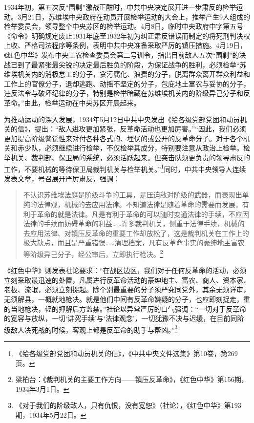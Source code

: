 1934年初，第五次反“围剿”激战正酣时，中共中央决定展开进一步肃反的检举运动。3月21日，苏维埃中央政府在动员开展检举运动的大会上，推举产生9人组成的检举委员会，领导整个中央苏区的检举运动。4月8日，临时中央政府中字第五号《命令》明确规定废止1931年底至1932年初为纠正肃反错误而制定的将死刑判决权上收、严格司法程序等条例，表明中共中央准备采取严厉的镇压措施。4月19日，《红色中华》发布中央工农检查委员会第二号训令，指出目前敌人五次“围剿”的决战已到了最紧张最尖锐的决定最后胜负的阶段，为保证战争的胜利，必须检举“苏维埃机关内的消极怠工的分子，贪污腐化、浪费的分子，脱离群众离开群众利益和工作上的官僚分子，退却逃跑、动摇不坚定的分子，包庇地土富农与妥协的分子，违反法令与破坏纪律的分子，特别是检举暗藏在苏维埃机关内的阶级异己分子和反革命。”由此，检举运动在中央苏区开展起来。


为推动运动的深入发展，1934年5月12日中共中央发出《给各级党部党团和动员机关的信》，提出：“敌人进攻更加紧张，反革命活动也更加厉害。”“因此，我们必须更加提高阶级警觉性来对付各种各式的、埋伏的或公开的反革命分子。对于各个机关和赤少队，必须继续进行检举，不仅检举其成分，特别要注意从政治上检举。检举机关、裁判部、保卫局的系统，必须活跃起来。但突击队须更负责的领导肃反的工作，不要机械的等待保卫局裁判机关与检举机关。”\footnote{《给各级党部党团和动员机关的信》，《中共中央文件选集》第10卷，第269页。}同时，中共中央领导人连续发表文章，号召展开严厉肃反，强调：

\begin{quote}

不认识苏维埃法庭是阶级斗争的工具，是压迫敌对阶级的武器，而表现出单纯的法律观，机械的去应用法律。不知道法律是随着革命的需要而发展，有利于革命的就是法律。凡是有利于革命的可以随时变通法律的手续，不应因法律的手续而妨碍革命的利益……许多裁判机关，侧重于法律手续，机械的去应用法律、对镇压反革命的重要工作却放松了，这是裁判机关在工作上的极大缺点，而且是严重错误……清理档案，凡有反革命事实的豪绅地主富农等阶级异己分子，经公审后，立即执行枪决。\footnote{梁柏台：《裁判机关的主要工作方向——镇压反革命》，《红色中华》第156期，1934年3月1日。}
\end{quote}


《红色中华》则发表社论要求：“在战区边区，我们对于任何反革命的活动，必须立刻采取最迅速的处置，凡属进行反革命活动的豪绅地主、富农、商人、资本家、老板、流氓，必须立刻捉起。除个别最重要的分子须严究同党外，其余无须详审，无须解县，一概就地枪决。就是他们中间有反革命嫌疑的分子，也应即刻捉走，重的当地枪决，轻的押解后方监禁。”社论以异常严厉的口气强调：“一切对于反革命的宽容与放纵，一切‘讲究手续’与‘法律观念’，一切犹豫不决与迟缓，在目前同阶级敌人决死战的时候，客观上都是反革命的助手与帮凶。”\footnote{《对于我们的阶级敌人，只有仇恨，没有宽恕》（社论），《红色中华》第193期，1934年5月22日。}


